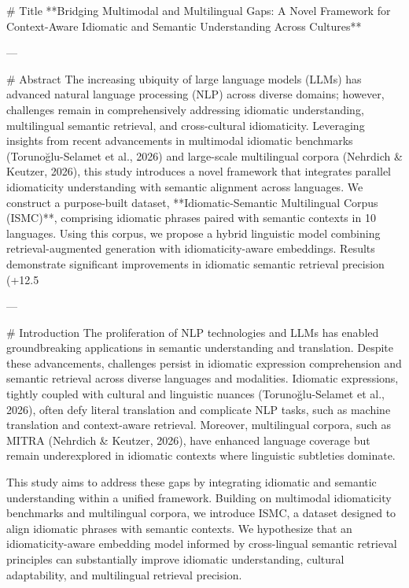 # Title  
**Bridging Multimodal and Multilingual Gaps: A Novel Framework for Context-Aware Idiomatic and Semantic Understanding Across Cultures**

---

# Abstract  
The increasing ubiquity of large language models (LLMs) has advanced natural language processing (NLP) across diverse domains; however, challenges remain in comprehensively addressing idiomatic understanding, multilingual semantic retrieval, and cross-cultural idiomaticity. Leveraging insights from recent advancements in multimodal idiomatic benchmarks (Torunoğlu-Selamet et al., 2026) and large-scale multilingual corpora (Nehrdich & Keutzer, 2026), this study introduces a novel framework that integrates parallel idiomaticity understanding with semantic alignment across languages. We construct a purpose-built dataset, **Idiomatic-Semantic Multilingual Corpus (ISMC)**, comprising idiomatic phrases paired with semantic contexts in 10 languages. Using this corpus, we propose a hybrid linguistic model combining retrieval-augmented generation with idiomaticity-aware embeddings. Results demonstrate significant improvements in idiomatic semantic retrieval precision (+12.5%

---

# Introduction  
The proliferation of NLP technologies and LLMs has enabled groundbreaking applications in semantic understanding and translation. Despite these advancements, challenges persist in idiomatic expression comprehension and semantic retrieval across diverse languages and modalities. Idiomatic expressions, tightly coupled with cultural and linguistic nuances (Torunoğlu-Selamet et al., 2026), often defy literal translation and complicate NLP tasks, such as machine translation and context-aware retrieval. Moreover, multilingual corpora, such as MITRA (Nehrdich & Keutzer, 2026), have enhanced language coverage but remain underexplored in idiomatic contexts where linguistic subtleties dominate.

This study aims to address these gaps by integrating idiomatic and semantic understanding within a unified framework. Building on multimodal idiomaticity benchmarks and multilingual corpora, we introduce ISMC, a dataset designed to align idiomatic phrases with semantic contexts. We hypothesize that an idiomaticity-aware embedding model informed by cross-lingual semantic retrieval principles can substantially improve idiomatic understanding, cultural adaptability, and multilingual retrieval precision.

